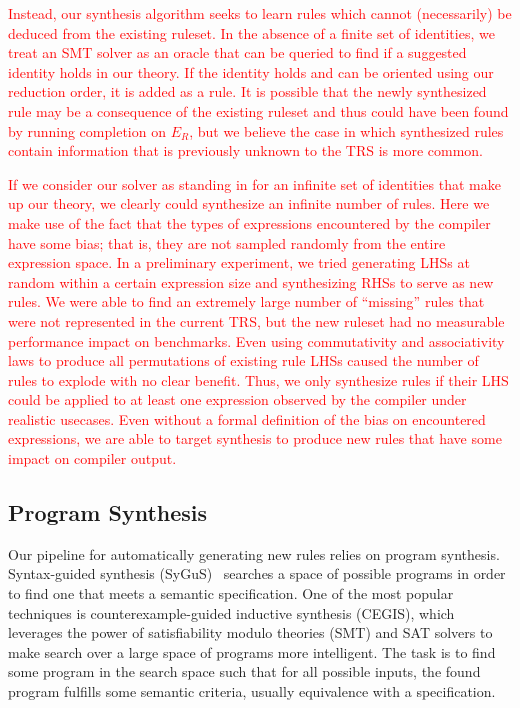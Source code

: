 \documentclass[acmsmall,review,anonymous]{acmart}\settopmatter{printfolios=true,printccs=false,printacmref=false}
\newcommand{\modified}[1]{\textcolor{red}{{#1}}}
\begin{document}
\modified{Instead, our synthesis algorithm seeks to learn rules which cannot (necessarily) be 
deduced from the existing ruleset. In the absence of a finite set of identities, we 
treat an SMT solver as an oracle that can be queried to find if a suggested identity 
holds in our theory. If the identity holds and can be oriented using our reduction order, 
it is added as a rule. It is possible that the newly synthesized rule may be a consequence 
of the existing ruleset and thus could have been found by running completion on $E_R$, 
but we believe the case in which synthesized rules contain information that is previously 
unknown to the TRS is more common. }

\modified{If we consider our solver as standing in for an infinite set of identities that make up
our theory, we clearly could synthesize an infinite number of rules. Here we make use
of the fact that the types of expressions encountered by the compiler have some bias; 
that is, they are not sampled randomly from the entire expression space. In a preliminary 
experiment, we tried generating LHSs at random within a certain expression size and 
synthesizing RHSs to serve as new rules. We were able to find an extremely large number of 
``missing'' rules that were not represented in the current TRS, but the new ruleset had 
no measurable performance impact on benchmarks. Even using commutativity and associativity 
laws to produce all permutations of existing rule LHSs caused the number of rules to 
explode with no clear benefit. Thus, we only synthesize rules if their LHS could be 
applied to at least one expression observed by the compiler under realistic usecases. Even 
without a formal definition of the bias on encountered expressions, we are able to 
target synthesis to produce new rules that have some impact on compiler output.}

\subsection{Program Synthesis}
Our pipeline for automatically generating new rules relies on program synthesis.
Syntax-guided synthesis (SyGuS)~\cite{sygus} searches a space of possible programs in order to find one that meets
a semantic specification.  One of the most popular techniques is counterexample-guided
inductive synthesis (CEGIS), which leverages the power of satisfiability modulo theories
(SMT) and SAT solvers to make search over a large space of programs more intelligent.
The task is to find some program in the search space such that for all possible
inputs, the found program fulfills some semantic criteria, usually equivalence with
a specification.
\end{document}
